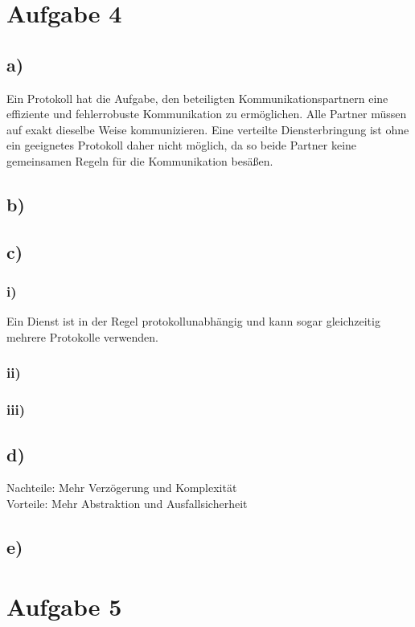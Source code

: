 \documentclass[a4paper,12pt]{scrartcl}
\begin{document}
\section{Aufgabe 4}
\subsection{a)}
Ein Protokoll hat die Aufgabe, den beteiligten Kommunikationspartnern eine
effiziente und fehlerrobuste Kommunikation zu ermöglichen. Alle Partner müssen
auf exakt dieselbe Weise kommunizieren.
Eine verteilte Diensterbringung ist ohne ein geeignetes Protokoll daher nicht möglich, da so beide Partner keine gemeinsamen Regeln für die Kommunikation besäßen.

\subsection{b)}

\subsection{c)}
\subsubsection{i)}
Ein Dienst ist in der Regel protokollunabhängig und kann sogar gleichzeitig
mehrere Protokolle verwenden.

\subsubsection{ii)}

\subsubsection{iii)}

\subsection{d)}
Nachteile: Mehr Verzögerung und Komplexität \\
Vorteile: Mehr Abstraktion und Ausfallsicherheit

\subsection{e)}

\section{Aufgabe 5}
\end{document}
